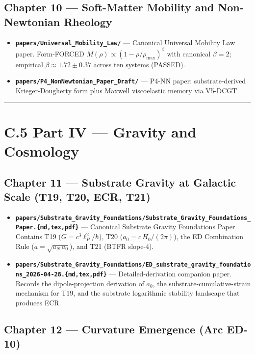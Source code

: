 \documentclass[11pt]{book}
\begin{document}
\subsection{Chapter 10 — Soft-Matter Mobility and Non-Newtonian Rheology}

\begin{itemize}
\item \textbf{\texttt{papers/Universal\_Mobility\_Law/}} — Canonical Universal Mobility Law paper. Form-FORCED $M(\rho) \propto (1 - \rho/\rho_\mathrm{max})^\beta$ with canonical $\beta = 2$; empirical $\beta \approx 1.72 \pm 0.37$ across ten systems (PASSED).
\item \textbf{\texttt{papers/P4\_NonNewtonian\_Paper\_Draft/}} — P4-NN paper: substrate-derived Krieger-Dougherty form plus Maxwell viscoelastic memory via V5-DCGT.
\end{itemize}

\bigskip\hrule\bigskip

\section{C.5 Part IV — Gravity and Cosmology}

\subsection{Chapter 11 — Substrate Gravity at Galactic Scale (T19, T20, ECR, T21)}

\begin{itemize}
\item \textbf{\texttt{papers/Substrate\_Gravity\_Foundations/Substrate\_Gravity\_Foundations\_Paper.\{md,tex,pdf\}}} — Canonical Substrate Gravity Foundations Paper. Contains T19 ($G = c^3\ell_P^2/\hbar$), T20 ($a_0 = c\,H_0/(2\pi)$), the ED Combination Rule ($a = \sqrt{a_N\,a_0}$), and T21 (BTFR slope-4).
\item \textbf{\texttt{papers/Substrate\_Gravity\_Foundations/ED\_substrate\_gravity\_foundations\_2026-04-28.\{md,tex,pdf\}}} — Detailed-derivation companion paper. Records the dipole-projection derivation of $a_0$, the substrate-cumulative-strain mechanism for T19, and the substrate logarithmic stability landscape that produces ECR.
\end{itemize}

\subsection{Chapter 12 — Curvature Emergence (Arc ED-10)}
\end{document}
